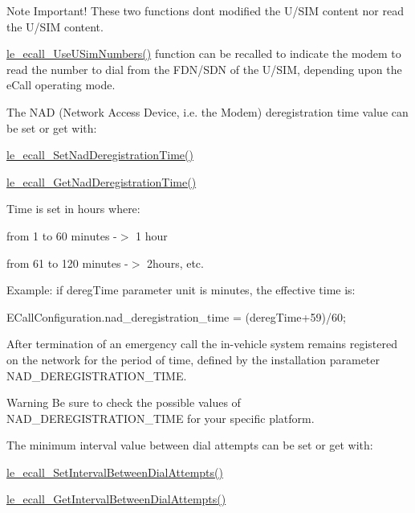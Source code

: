 \begin{DoxyNote}{Note}
Important! These two functions don\textquotesingle{}t modified the U/\+S\+I\+M content nor read the U/\+S\+I\+M content.
\end{DoxyNote}
\hyperlink{le__ecall__interface_8h_a034c442fd7c6650ed956822a561c0104}{le\+\_\+ecall\+\_\+\+Use\+U\+Sim\+Numbers()} function can be recalled to indicate the modem to read the number to dial from the F\+D\+N/\+S\+D\+N of the U/\+S\+I\+M, depending upon the e\+Call operating mode.

The N\+A\+D (Network Access Device, i.\+e. the Modem) deregistration time value can be set or get with\+:
\begin{DoxyItemize}
\item \hyperlink{le__ecall__interface_8h_a66e454e84db7d337d76bc867b57891a1}{le\+\_\+ecall\+\_\+\+Set\+Nad\+Deregistration\+Time()}
\item \hyperlink{le__ecall__interface_8h_a0f24b673049d51baf132ace25e2fa161}{le\+\_\+ecall\+\_\+\+Get\+Nad\+Deregistration\+Time()}
\end{DoxyItemize}

Time is set in hours where\+:
\begin{DoxyItemize}
\item from 1 to 60 minutes -\/$>$ 1 hour
\item from 61 to 120 minutes -\/$>$ 2hours, etc.
\end{DoxyItemize}

Example\+: if {\ttfamily dereg\+Time} parameter unit is minutes, the effective time is\+: 
\begin{DoxyCode}
ECallConfiguration.nad\_deregistration\_time = (deregTime+59)/60; 
\end{DoxyCode}


After termination of an emergency call the in-\/vehicle system remains registered on the network for the period of time, defined by the installation parameter \textquotesingle{}N\+A\+D\+\_\+\+D\+E\+R\+E\+G\+I\+S\+T\+R\+A\+T\+I\+O\+N\+\_\+\+T\+I\+M\+E\textquotesingle{}.

\begin{DoxyWarning}{Warning}
Be sure to check the possible values of \textquotesingle{}N\+A\+D\+\_\+\+D\+E\+R\+E\+G\+I\+S\+T\+R\+A\+T\+I\+O\+N\+\_\+\+T\+I\+M\+E\textquotesingle{} for your specific platform.
\end{DoxyWarning}
The minimum interval value between dial attempts can be set or get with\+:
\begin{DoxyItemize}
\item \hyperlink{le__ecall__interface_8h_af90a8602d4b1d0cacaa3971c508dd188}{le\+\_\+ecall\+\_\+\+Set\+Interval\+Between\+Dial\+Attempts()}
\item \hyperlink{le__ecall__interface_8h_a3a24ae5a007d0c43db2bc55caa43c19d}{le\+\_\+ecall\+\_\+\+Get\+Interval\+Between\+Dial\+Attempts()}
\end{DoxyItemize}

